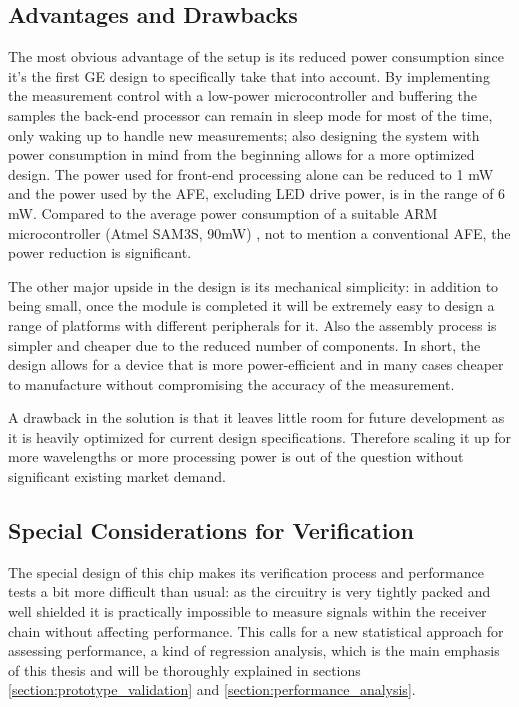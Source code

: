 \subsection{Advantages and Drawbacks}

The most obvious advantage of the setup is its reduced power consumption since it's the first GE design to specifically take that into account. By implementing the measurement control with a low-power microcontroller and buffering the samples the back-end processor can remain in sleep mode for most of the time, only waking up to handle new measurements; also designing the system with power consumption in mind from the beginning allows for a more optimized design. The power used for front-end processing alone can be reduced to 1 mW and the power used by the AFE, excluding LED drive power, is in the range of 6 mW. Compared to the average power consumption of a suitable ARM microcontroller (Atmel SAM3S, 90mW) \cite{ATMEL2009}, not to mention a conventional AFE, the power reduction is significant.

The other major upside in the design is its mechanical simplicity: in addition to being small, once the module is completed it will be extremely easy to design a range of platforms with different peripherals for it. Also the assembly process is simpler and cheaper due to the reduced number of components. In short, the design allows for a device that is more power-efficient and in many cases cheaper to manufacture without compromising the accuracy of the measurement.

A drawback in the solution is that it leaves little room for future development as it is heavily optimized for current design specifications. Therefore scaling it up for more wavelengths or more processing power is out of the question without significant existing market demand.

\subsection{Special Considerations for Verification}

The special design of this chip makes its verification process and performance tests a bit more difficult than usual: as the circuitry is very tightly packed and well shielded it is practically impossible to measure signals within the receiver chain without affecting performance. This calls for a new statistical approach for assessing performance, a kind of regression analysis, which is the main emphasis of this thesis and will be thoroughly explained in sections \ref{section:prototype_validation} and \ref{section:performance_analysis}.